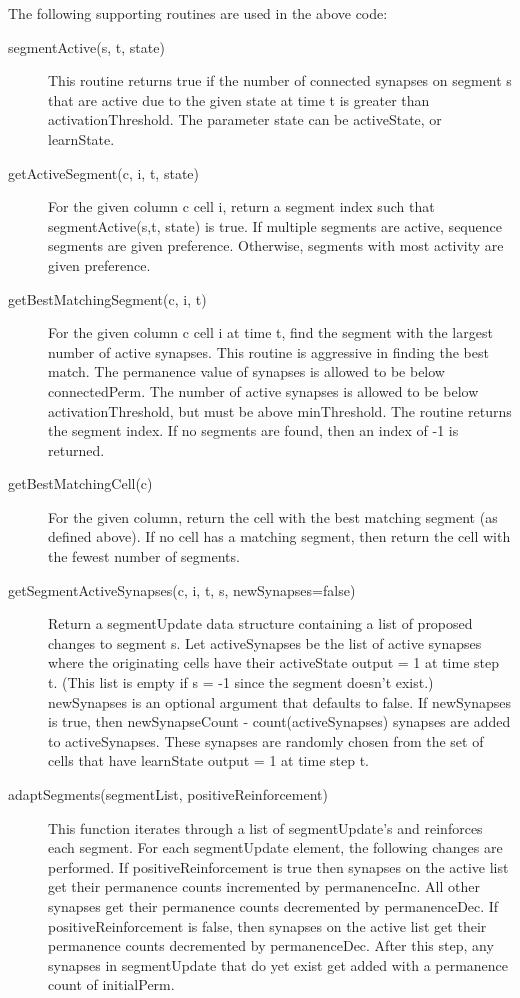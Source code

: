 \documentclass{report}
\begin{document}
The following supporting routines are used in the above code:

\begin{description}
\item[segmentActive(s, t, state)] This routine returns true if the
  number of connected synapses on segment s that are active due to the
  given state at time t is greater than activationThreshold. The
  parameter state can be activeState, or learnState.
\item[getActiveSegment(c, i, t, state)] For the given column c cell i,
  return a segment index such that segmentActive(s,t, state) is
  true. If multiple segments are active, sequence segments are given
  preference. Otherwise, segments with most activity are given
  preference.
\item[getBestMatchingSegment(c, i, t)] For the given column c cell i
  at time t, find the segment with the largest number of active
  synapses. This routine is aggressive in finding the best match. The
  permanence value of synapses is allowed to be below
  connectedPerm. The number of active synapses is allowed to be below
  activationThreshold, but must be above minThreshold. The routine
  returns the segment index. If no segments are found, then an index
  of -1 is returned.
\item[getBestMatchingCell(c)] For the given column, return the cell
  with the best matching segment (as defined above). If no cell has a
  matching segment, then return the cell with the fewest number of
  segments.
\item[getSegmentActiveSynapses(c, i, t, s, newSynapses=false)] Return
  a segmentUpdate data structure containing a list of proposed changes
  to segment s. Let activeSynapses be the list of active synapses
  where the originating cells have their activeState output = 1 at
  time step t. (This list is empty if s = -1 since the segment doesn't
  exist.) newSynapses is an optional argument that defaults to
  false. If newSynapses is true, then newSynapseCount -
  count(activeSynapses) synapses are added to activeSynapses. These
  synapses are randomly chosen from the set of cells that have
  learnState output = 1 at time step t.
\item[adaptSegments(segmentList, positiveReinforcement)] This function
  iterates through a list of segmentUpdate's and reinforces each
  segment. For each segmentUpdate element, the following changes are
  performed. If positiveReinforcement is true then synapses on the
  active list get their permanence counts incremented by
  permanenceInc. All other synapses get their permanence counts
  decremented by permanenceDec. If positiveReinforcement is false,
  then synapses on the active list get their permanence counts
  decremented by permanenceDec. After this step, any synapses in
  segmentUpdate that do yet exist get added with a permanence count of
  initialPerm.
\end{description}
\end{document}
